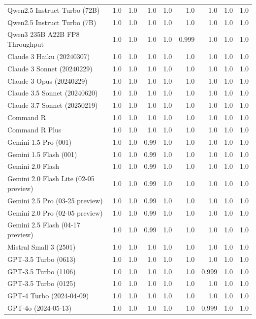 \begin{table}[htp]
{\begin{tabular}{lrrrrrrrr}
Qwen2.5 Instruct Turbo (72B) & 1.0 & 1.0 & 1.0 & 1.0 & 1.0 & 1.0 & 1.0 & 1.0 \\
Qwen2.5 Instruct Turbo (7B) & 1.0 & 1.0 & 1.0 & 1.0 & 1.0 & 1.0 & 1.0 & 1.0 \\
Qwen3 235B A22B FP8 Throughput & 1.0 & 1.0 & 1.0 & 1.0 & 0.999 & 1.0 & 1.0 & 1.0 \\
Claude 3 Haiku (20240307) & 1.0 & 1.0 & 1.0 & 1.0 & 1.0 & 1.0 & 1.0 & 1.0 \\
Claude 3 Sonnet (20240229) & 1.0 & 1.0 & 1.0 & 1.0 & 1.0 & 1.0 & 1.0 & 1.0 \\
Claude 3 Opus (20240229) & 1.0 & 1.0 & 1.0 & 1.0 & 1.0 & 1.0 & 1.0 & 1.0 \\
Claude 3.5 Sonnet (20240620) & 1.0 & 1.0 & 1.0 & 1.0 & 1.0 & 1.0 & 1.0 & 1.0 \\
Claude 3.7 Sonnet (20250219) & 1.0 & 1.0 & 1.0 & 1.0 & 1.0 & 1.0 & 1.0 & 1.0 \\
Command R & 1.0 & 1.0 & 1.0 & 1.0 & 1.0 & 1.0 & 1.0 & 1.0 \\
Command R Plus & 1.0 & 1.0 & 1.0 & 1.0 & 1.0 & 1.0 & 1.0 & 1.0 \\
Gemini 1.5 Pro (001) & 1.0 & 1.0 & 0.99 & 1.0 & 1.0 & 1.0 & 1.0 & 1.0 \\
Gemini 1.5 Flash (001) & 1.0 & 1.0 & 0.99 & 1.0 & 1.0 & 1.0 & 1.0 & 1.0 \\
Gemini 2.0 Flash & 1.0 & 1.0 & 0.99 & 1.0 & 1.0 & 1.0 & 1.0 & 1.0 \\
Gemini 2.0 Flash Lite (02-05 preview) & 1.0 & 1.0 & 0.99 & 1.0 & 1.0 & 1.0 & 1.0 & 1.0 \\
Gemini 2.5 Pro (03-25 preview) & 1.0 & 1.0 & 0.99 & 1.0 & 1.0 & 1.0 & 1.0 & 1.0 \\
Gemini 2.0 Pro (02-05 preview) & 1.0 & 1.0 & 0.99 & 1.0 & 1.0 & 1.0 & 1.0 & 1.0 \\
Gemini 2.5 Flash (04-17 preview) & 1.0 & 1.0 & 0.99 & 1.0 & 1.0 & 1.0 & 1.0 & 1.0 \\
Mistral Small 3 (2501) & 1.0 & 1.0 & 1.0 & 1.0 & 1.0 & 1.0 & 1.0 & 1.0 \\
GPT-3.5 Turbo (0613) & 1.0 & 1.0 & 1.0 & 1.0 & 1.0 & 1.0 & 1.0 & 1.0 \\
GPT-3.5 Turbo (1106) & 1.0 & 1.0 & 1.0 & 1.0 & 1.0 & 0.999 & 1.0 & 1.0 \\
GPT-3.5 Turbo (0125) & 1.0 & 1.0 & 1.0 & 1.0 & 1.0 & 1.0 & 1.0 & 1.0 \\
GPT-4 Turbo (2024-04-09) & 1.0 & 1.0 & 1.0 & 1.0 & 1.0 & 1.0 & 1.0 & 1.0 \\
GPT-4o (2024-05-13) & 1.0 & 1.0 & 1.0 & 1.0 & 1.0 & 0.999 & 1.0 & 1.0 \\

\end{tabular}}
\end{table}
